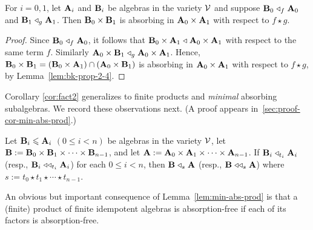 \begin{corollary}
\label{cor:fact2}
For $i=0, 1$, let $\mathbf{A}_i$ and $\mathbf{B}_i$ be algebras in the variety $\mathcal{V}$ and suppose
$\mathbf{B}_0 \mathrel{\triangleleft}_f \mathbf{A}_0$ and $\mathbf{B}_1 \mathrel{\triangleleft}_g \mathbf{A}_1$.
Then $\mathbf{B}_0\times \mathbf{B}_1$ is absorbing in $\mathbf{A}_0\times \mathbf{A}_1$ with respect to $f\star g$.
\end{corollary}
\begin{proof}
Since $\mathbf{B}_0 \mathrel{\triangleleft}_f \mathbf{A}_0$, it follows that
$\mathbf{B}_0\times \mathbf{A}_1 \mathrel{\triangleleft} \mathbf{A}_0\times \mathbf{A}_1$  with respect to the same term $f$.
Similarly $\mathbf{A}_0 \times \mathbf{B}_1 \mathrel{\triangleleft}_g \mathbf{A}_0\times \mathbf{A}_1$.
Hence, $\mathbf{B}_0\times \mathbf{B}_1=(\mathbf{B}_0\times \mathbf{A}_1) \cap (\mathbf{A}_0\times \mathbf{B}_1)$ is 
absorbing in $\mathbf{A}_0\times \mathbf{A}_1$ with respect to 
$f\star g$, by Lemma~\ref{lem:bk-prop-2-4}.
\end{proof}
Corollary \ref{cor:fact2} generalizes to finite products and \emph{minimal} 
absorbing subalgebras. We record these observations next. 
(A proof appears in~\ref{sec:proof-cor-min-abs-prod}.)
\begin{lemma}
\label{lem:min-abs-prod}
Let $\mathbf{B}_i \leqslant \mathbf{A}_i$ $(0\leq i < n)$ be algebras in the variety $\mathcal{V}$, 
let $\mathbf{B} := \mathbf{B}_0\times \mathbf{B}_1\times \cdots \times \mathbf{B}_{n-1}$, and let
$\mathbf{A} := \mathbf{A}_0\times \mathbf{A}_1\times \cdots \times \mathbf{A}_{n-1}$.
If $\mathbf{B}_i\mathrel{\triangleleft}_{t_i}\mathbf{A}_i$ (resp., $\mathbf{B}_i\mathrel{\triangleleft\triangleleft}_{t_i}\mathbf{A}_i$) for each $0\leq i < n$,
then $\mathbf{B} \mathrel{\triangleleft}_s \mathbf{A}$ (resp., $\mathbf{B} \mathrel{\triangleleft\triangleleft}_s \mathbf{A}$) 
where $s:= t_0\star t_1 \star \cdots \star t_{n-1}$.
\end{lemma}
An obvious but important consequence of Lemma~\ref{lem:min-abs-prod} is that a
(finite) product of finite idempotent algebras is absorption-free if
each of its factors is absorption-free.

